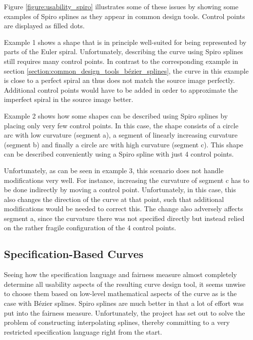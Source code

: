 \documentclass[a4paper]{article}
\begin{document}
				Figure \ref{figure:usability_spiro} illustrates some of these issues by showing some examples of Spiro splines as they appear in common design tools. Control points are displayed as filled dots.

				Example 1 shows a shape that is in principle well-suited for being represented by parts of the Euler spiral. Unfortunately, describing the curve using Spiro splines still requires many control points. In contrast to the corresponding example in section \ref{section:common_design_tools_bézier_splines}, the curve in this example is close to a perfect spiral an thus does not match the source image perfectly. Additional control points would have to be added in order to approximate the imperfect spiral in the source image better.

				Example 2 shows how some shapes can be described using Spiro splines by placing only very few control points. In this case, the shape consists of a circle arc with low curvature (segment a), a segment of linearly increasing curvature (segment b) and finally a circle arc with high curvature (segment c). This shape can be described conveniently using a Spiro spline with just 4 control points.

				Unfortunately, as can be seen in example 3, this scenario does not handle modifications very well. For instance, increasing the curvature of segment c has to be done indirectly by moving a control point. Unfortunately, in this case, this also changes the direction of the curve at that point, such that additional modifications would be needed to correct this. The change also adversely affects segment a, since the curvature there was not specified directly but instead relied on the rather fragile configuration of the 4 control points.

		\subsection{Specification-Based Curves}
		\label{section:specification-based_curves}

			Seeing how the specification language and fairness measure almost completely determine all usability aspects of the resulting curve design tool, it seems unwise to choose them based on low-level mathematical aspects of the curve as is the case with Bézier splines. Spiro splines are much better in that a lot of effort was put into the fairness measure. Unfortunately, the project has set out to solve the problem of constructing interpolating splines, thereby committing to a very restricted specification language right from the start.
\end{document}

